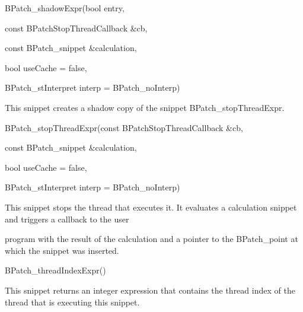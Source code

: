 {{{{{{{BPatch_shadowExpr(bool entry,}



{

const BPatchStopThreadCallback &cb,}



{

const BPatch_snippet &calculation,}



{

bool useCache = false,}



{

BPatch_stInterpret interp = BPatch_noInterp)}



{

This snippet creates a shadow copy of the snippet BPatch_stopThreadExpr.}





\bigskip



{

BPatch_stopThreadExpr(const BPatchStopThreadCallback &cb,}



{

const BPatch_snippet &calculation,}



{

bool useCache = false,}



{

BPatch_stInterpret interp = BPatch_noInterp)}



{

This snippet stops the thread that executes it. It evaluates a calculation snippet and triggers a callback to the user

program with the result of the calculation and a pointer to the BPatch_point at which the snippet was inserted.}





\bigskip



{

BPatch_threadIndexExpr()}



{

This snippet returns an integer expression that contains the thread index of the thread that is executing this snippet.

}}}}}}}
